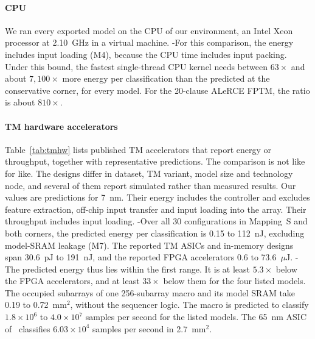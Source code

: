 \paragraph{CPU}
We ran every exported model on the CPU of our environment, an Intel Xeon processor at 2.10~GHz in a virtual machine.
\hyp{For this comparison, the \gainp{} energy includes input loading (M4), because the CPU time includes input packing. Under this bound, the fastest single-thread CPU kernel needs between $63\times$ and about $7{,}100\times$ more energy per classification than the predicted \gainp{} at the conservative corner, for every model. For the 20-clause ALeRCE FPTM, the ratio is about $810\times$.}

\paragraph{TM hardware accelerators}
Table~\ref{tab:tmhw} lists published TM accelerators that report energy or throughput, together with representative \gainp{} predictions.
The comparison is not like for like. The designs differ in dataset, TM variant, model size and technology node, and several of them report simulated rather than measured results.
Our \gainp{} values are predictions for 7~nm. Their energy includes the controller and excludes feature extraction, off-chip input transfer and input loading into the array. Their throughput includes input loading.
\hyp{Over all 30 configurations in Mapping~S and both corners, the predicted \gainp{} energy per classification is 0.15 to 112~nJ, excluding model-SRAM leakage (M7).} The reported TM ASICs and in-memory designs span 30.6~pJ to 191~nJ, and the reported FPGA accelerators 0.6 to 73.6~$\mu$J. \hyp{The predicted \gainp{} energy thus lies within the first range. It is at least $5.3\times$ below the FPGA accelerators, and at least $33\times$ below them for the four listed models.
The occupied subarrays of one 256-subarray macro and its model SRAM take 0.19 to 0.72~mm$^2$, without the sequencer logic. The macro is predicted to classify $1.8\times10^6$ to $4.0\times10^7$ samples per second for the listed models.} The 65~nm ASIC of~\cite{tunheim2026asic} classifies $6.03\times10^4$ samples per second in 2.7~mm$^2$.

